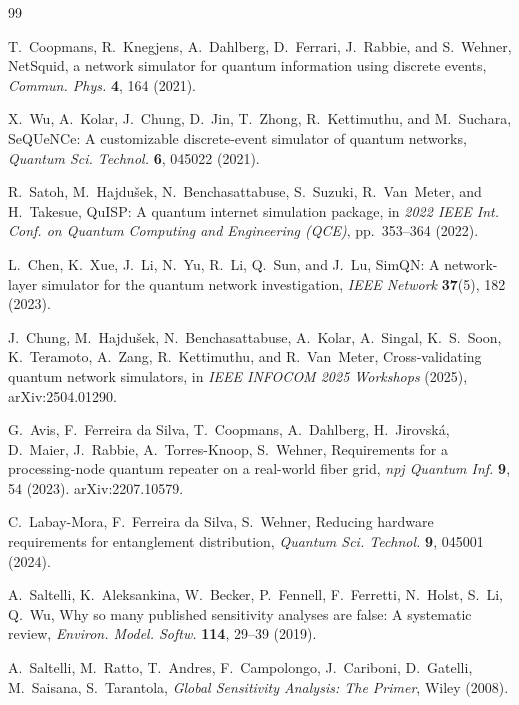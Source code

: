 \documentclass[aps,prapplied,reprint,superscriptaddress]{revtex4-2}
\begin{document}
\begin{thebibliography}{99}

T.~Coopmans, R.~Knegjens, A.~Dahlberg, D.~Ferrari, J.~Rabbie, and S.~Wehner,
NetSquid, a network simulator for quantum information using discrete events,
\textit{Commun. Phys.} \textbf{4}, 164 (2021).

X.~Wu, A.~Kolar, J.~Chung, D.~Jin, T.~Zhong, R.~Kettimuthu, and M.~Suchara,
SeQUeNCe: A customizable discrete-event simulator of quantum networks,
\textit{Quantum Sci. Technol.} \textbf{6}, 045022 (2021).

R.~Satoh, M.~Hajdu{\v{s}}ek, N.~Benchasattabuse, S.~Suzuki, R.~Van~Meter, and H.~Takesue,
QuISP: A quantum internet simulation package,
in \textit{2022 IEEE Int. Conf. on Quantum Computing and Engineering (QCE)}, pp.~353--364 (2022).

L.~Chen, K.~Xue, J.~Li, N.~Yu, R.~Li, Q.~Sun, and J.~Lu,
SimQN: A network-layer simulator for the quantum network investigation,
\textit{IEEE Network} \textbf{37}(5), 182 (2023).

J.~Chung, M.~Hajdu{\v{s}}ek, N.~Benchasattabuse, A.~Kolar, A.~Singal, K.~S.~Soon, K.~Teramoto, A.~Zang, R.~Kettimuthu, and R.~Van~Meter,
Cross-validating quantum network simulators,
in \textit{IEEE INFOCOM 2025 Workshops} (2025), arXiv:2504.01290.

G.~Avis, F.~Ferreira da Silva, T.~Coopmans, A.~Dahlberg, H.~Jirovsk\'a, D.~Maier, J.~Rabbie, A.~Torres-Knoop, S.~Wehner,
Requirements for a processing-node quantum repeater on a real-world fiber grid,
\emph{npj Quantum Inf.} \textbf{9}, 54 (2023). arXiv:2207.10579.

C.~Labay-Mora, F.~Ferreira da Silva, S.~Wehner,
Reducing hardware requirements for entanglement distribution,
\emph{Quantum Sci. Technol.} \textbf{9}, 045001 (2024).

A.~Saltelli, K.~Aleksankina, W.~Becker, P.~Fennell, F.~Ferretti, N.~Holst, S.~Li, Q.~Wu,
Why so many published sensitivity analyses are false: A systematic review,
\emph{Environ. Model. Softw.} \textbf{114}, 29--39 (2019).

A.~Saltelli, M.~Ratto, T.~Andres, F.~Campolongo, J.~Cariboni, D.~Gatelli, M.~Saisana, S.~Tarantola,
\emph{Global Sensitivity Analysis: The Primer}, Wiley (2008).


\end{thebibliography}
\end{document}
